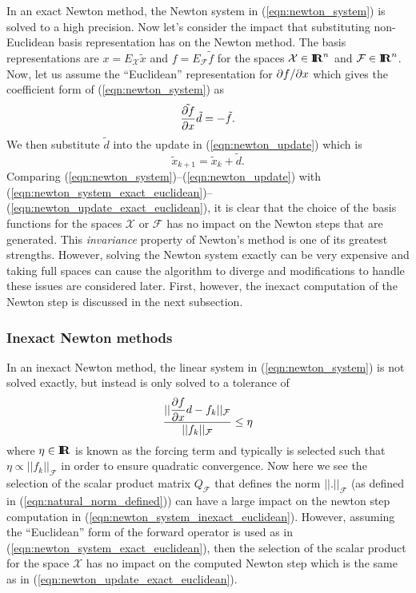 In an exact Newton method, the Newton system in (\ref{eqn:newton_system}) is
solved to a high precision.  Now let's consider the impact that substituting
non-Euclidean basis representation has on the Newton method.  The basis
representations are $x = E_{\mathcal{X}}\tilde{x}$ and $f =
E_{\mathcal{F}}\tilde{f}$ for the spaces $\mathcal{X}\in\mbox{\textbf{I}}\hspace{-0.6ex}\mbox{\textbf{R}}^n$ and
$\mathcal{F}\in\mbox{\textbf{I}}\hspace{-0.6ex}\mbox{\textbf{R}}^n$.  Now, let us assume the ``Euclidean'' representation
for $\partial f / \partial x$ which gives the coefficient form of (\ref{eqn:newton_system})
as
%
\begin{equation}
\tilde{\displaystyle{\frac{\partial f}{\partial x}}} \tilde{d} = - \tilde{f}.
\label{eqn:newton_system_exact_euclidean}
\end{equation}
%
We then substitute $\tilde d$ into the update in (\ref{eqn:newton_update})
which is
%
\begin{equation}
\tilde{x}_{k+1} = \tilde{x}_k + \tilde{d}.
\label{eqn:newton_update_exact_euclidean}
\end{equation}
%
Comparing (\ref{eqn:newton_system})--(\ref{eqn:newton_update}) with
(\ref{eqn:newton_system_exact_euclidean})--(\ref{eqn:newton_update_exact_euclidean}),
it is clear that the choice of the basis functions for the spaces
$\mathcal{X}$ or $\mathcal{F}$ has no impact on the Newton steps that are
generated.  This {}\textit{invariance} property of Newton's method is one of
its greatest strengths.  However, solving the Newton system exactly can be
very expensive and taking full spaces can cause the algorithm to diverge and
modifications to handle these issues are considered later.  First, however, the
inexact computation of the Newton step is discussed in the next subsection.

\subsubsection*{Inexact Newton methods}

In an inexact Newton method, the linear system in (\ref{eqn:newton_system}) is
not solved exactly, but instead is only solved to a tolerance of
%
\begin{equation}
\frac{||\displaystyle{\frac{\partial f}{\partial x}} d - f_k||_{\mathcal{F}}}{||f_k||_{\mathcal{F}}} \le \eta
\label{eqn:newton_system_inexact_euclidean}
\end{equation}
%
where $\eta\in\mbox{\textbf{I}}\hspace{-0.6ex}\mbox{\textbf{R}}$ is known as the forcing term and typically is selected such
that $\eta {}\propto ||f_k||_{\mathcal{F}}$ in order to ensure quadratic
convergence.  Now here we see the selection of the scalar product matrix
$Q_{\mathcal{F}}$ that defines the norm $||.||_{\mathcal{F}}$ (as defined in
(\ref{eqn:natural_norm_defined})) can have a large impact on the newton step
computation in (\ref{eqn:newton_system_inexact_euclidean}).  However, assuming
the ``Euclidean'' form of the forward operator is used as in
(\ref{eqn:newton_system_exact_euclidean}), then the selection of the scalar
product for the space $\mathcal{X}$ has no impact on the computed Newton step
which is the same as in (\ref{eqn:newton_update_exact_euclidean}).

